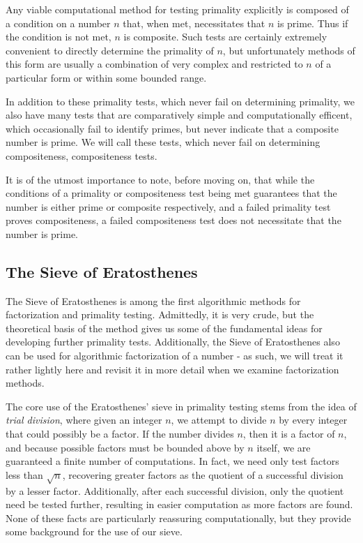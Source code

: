 \documentclass{article}
\begin{document}
\par Any viable computational method for testing primality explicitly is composed of a condition on a number $n$ that, when met, necessitates that $n$ is prime. Thus if the condition is not met, $n$ is composite. Such tests are certainly extremely convenient to directly determine the primality of $n$, but unfortunately methods of this form are usually a combination of very complex and restricted to $n$ of a particular form or within some bounded range.
\par In addition to these primality tests, which never fail on determining primality, we also have many tests that are comparatively simple and computationally efficent, which occasionally fail to identify primes, but never indicate that a composite number is prime. We will call these tests, which never fail on determining compositeness, compositeness tests.
\par It is of the utmost importance to note, before moving on, that while the conditions of a primality or compositeness test being met guarantees that the number is either prime or composite respectively, and a failed primality test proves compositeness, a failed compositeness test does not necessitate that the number is prime.

\subsection{ The Sieve of Eratosthenes }

\par The Sieve of Eratosthenes is among the first algorithmic methods for factorization and primality testing. Admittedly, it is very crude, but the theoretical basis of the method gives us some of the fundamental ideas for developing further primality tests. Additionally, the Sieve of Eratosthenes also can be used for algorithmic factorization of a number - as such, we will treat it rather lightly here and revisit it in more detail when we examine factorization methods.

\par The core use of the Eratosthenes' sieve in primality testing stems from the idea of \textit{trial division}, where given an integer $n$, we attempt to divide $n$ by every integer that could possibly be a factor. If the number divides $n$, then it is a factor of $n$, and because possible factors must be bounded above by $n$ itself, we are guaranteed a finite number of computations. In fact, we need only test factors less than $\sqrt{n}$, recovering greater factors as the quotient of a successful division by a lesser factor. Additionally, after each successful division, only the quotient need be tested further, resulting in easier computation as more factors are found. None of these facts are particularly reassuring computationally, but they provide some background for the use of our sieve.
\end{document}
